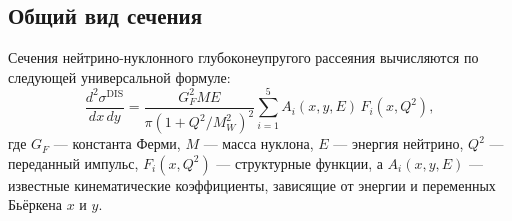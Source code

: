 
\subsection{Общий вид сечения}
Сечения нейтрино-нуклонного глубоконеупругого рассеяния вычисляются по следующей универсальной формуле:
\begin{equation}
    \frac{d^2 \sigma^{\text{DIS}}}{dx\,dy} = \frac{G_F^2 M E}{\pi(1 + Q^2/M_W^2)^2} \sum\limits_{i=1}^{5} A_i(x, y, E)\,F_i(x, Q^2),
    \label{eq:xsec_general}
\end{equation}
где $G_F$ — константа Ферми, $M$ — масса нуклона, $E$ — энергия нейтрино, $Q^2$ — переданный импульс, $F_i(x, Q^2)$ — структурные функции, а $A_i(x, y, E)$ — известные кинематические коэффициенты, зависящие от энергии и переменных Бьёркена $x$ и $y$. 

